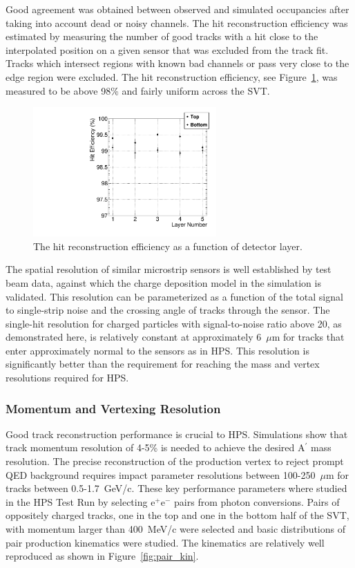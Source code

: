\documentclass[final,3p,times,twocolumn]{elsarticle}
\newcommand{\Aprime}{A\ensuremath{^\prime}}
\newcommand{\ee}{e$^+$e$^-$}
\begin{document}
Good agreement was obtained between observed and simulated occupancies after taking into account 
dead or noisy channels. The hit reconstruction efficiency was estimated by measuring 
the number of good tracks with a hit close to the interpolated position on a given sensor that was excluded 
from the track fit. Tracks which intersect regions with known bad channels or pass very 
close to the edge region were excluded. The hit reconstruction efficiency, see Figure~\ref{fig:hit_efficiency}, 
was measured to be above 98\% and fairly uniform across the SVT. 
\begin{figure}[]
\begin{center}
\includegraphics[width=7cm]{single_hit_efficiency.pdf}
\caption{\small The hit reconstruction efficiency as a function of detector layer.
\label{fig:hit_efficiency}}
\end{center}
\end{figure}


The spatial resolution of similar microstrip sensors is well established by test beam data, against which 
the charge deposition model in the simulation is validated.  This resolution can be parameterized as a 
function of the total signal to single-strip noise and the crossing angle of tracks through the sensor.  
The single-hit resolution for charged particles with signal-to-noise ratio above 20, as demonstrated 
here, is relatively constant at approximately 6~$\mu$m for tracks that enter approximately normal to 
the sensors as in HPS. This resolution is significantly better than the requirement for reaching the mass 
and vertex resolutions required for HPS.



\subsubsection{Momentum and Vertexing Resolution}
Good track reconstruction performance is crucial to HPS. Simulations show that track momentum resolution 
of 4-5\% is needed to achieve the desired \Aprime{} mass resolution. The precise reconstruction of the 
production vertex to reject prompt QED background requires impact parameter resolutions between 
100-250~$\mu$m for tracks between 0.5-1.7~GeV/c. These key performance parameters where studied 
in the HPS Test Run by selecting \ee{} pairs from photon conversions. Pairs of oppositely charged tracks, 
one in the top and one in the bottom half of the SVT, with momentum larger than 400~MeV/c were selected 
and basic distributions of pair production kinematics were studied.
The kinematics are relatively well reproduced as shown in Figure~\ref{fig:pair_kin}. 
\end{document}
